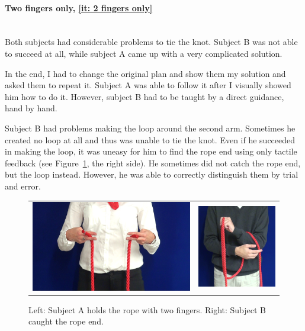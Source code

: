             \paragraph{Two fingers only, \ref{it: 2 fingers only} }~\\
                \indent Both subjects had considerable problems to tie the knot. Subject B was not able to succeed at all, while subject A came up with a very complicated solution.

                In the end, I had to change the original plan and show them my solution and asked them to repeat it. Subject A was able to follow it after I visually showed him how to do it. However, subject B had to be taught by a direct guidance, hand by hand.

                Subject B had problems making the loop around the second arm. Sometimes he created no loop at all and thus was unable to tie the knot. Even if he succeeded in making the loop, it was uneasy for him to find the rope end using only tactile feedback (see Figure~\ref{fig:SubjectAB}, the right side). He sometimes did not catch the rope end, but the loop instead. However, he was able to correctly distinguish them by trial and error.

                \begin{figure}[h]
                    \centering
                    \begin{tabular}{cc}
                    \includegraphics[height=0.3\textwidth]{ATwoFingers.png}
                    &
                    \includegraphics[height=0.3\textwidth]{BLookingForRopeEnd.png}
                    \end{tabular}
                    \caption{Left: Subject A holds the rope with two fingers. Right: Subject B caught the rope end.}
                    \label{fig:SubjectAB}
                \end{figure}

